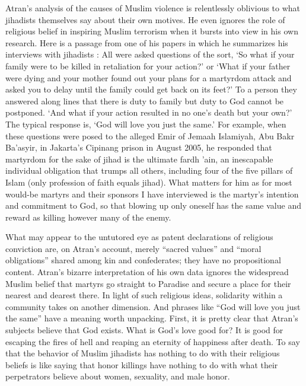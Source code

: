 \documentclass[a4paper,14pt]{extarticle}
\begin{document}
Atran’s analysis of the causes of Muslim violence is relentlessly oblivious to what jihadists themselves say about their own motives.
He even ignores the role of religious belief in inspiring Muslim terrorism when it bursts into view in his own research.
Here is a passage from one of his papers in which he summarizes his interviews with jihadists :
All were asked questions of the sort, `So what if your family were to be killed in retaliation for your action?' or `What if your father were dying and your mother found out your plans for a martyrdom attack and asked you to delay until the family could get back on its feet?'
To a person they answered along lines that there is duty to family but duty to God cannot be postponed.
`And what if your action resulted in no one’s death but your own?'
The typical response is, `God will love you just the same.'
For example, when these questions were posed to the alleged Emir of Jemaah Islamiyah, Abu Bakr Ba’asyir, in Jakarta’s Cipinang prison in August 2005, he responded that martyrdom for the sake of jihad is the ultimate fardh ’ain, an inescapable individual obligation that trumps all others, including four of the five pillars of Islam (only profession of faith equals jihad).
What matters for him as for most would-be martyrs and their sponsors I have interviewed is the martyr’s intention and commitment to God, so that blowing up only oneself has the same value and reward as killing however many of the enemy.

What may appear to the untutored eye as patent declarations of religious conviction are, on Atran’s account, merely ``sacred values'' and ``moral obligations'' shared among kin and confederates;
they have no propositional content.
Atran’s bizarre interpretation of his own data ignores the widespread Muslim belief that martyrs go straight to Paradise and secure a place for their nearest and dearest there.
In light of such religious ideas, solidarity within a community takes on another dimension.
And phrases like ``God will love you just the same'' have a meaning worth unpacking.
First, it is pretty clear that Atran’s subjects believe that God exists.
What is God’s love good for?
It is good for escaping the fires of hell and reaping an eternity of happiness after death.
To say that the behavior of Muslim jihadists has nothing to do with their religious beliefs is like saying that honor killings have nothing to do with what their perpetrators believe about women, sexuality, and male honor.
\end{document}
